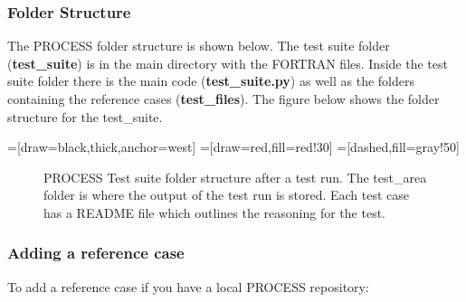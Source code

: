 \subsubsection{Folder Structure}

The PROCESS folder structure is shown below. The test suite folder (\textbf{test\_suite}) is in the main directory with the FORTRAN files. Inside the test suite folder there is the main code (\textbf{test\_suite.py}) as well as the folders containing the reference cases (\textbf{test\_files}). The figure below shows the folder structure for the test\_suite.

=[draw=black,thick,anchor=west]
=[draw=red,fill=red!30]
=[dashed,fill=gray!50]

\begin{figure}[!hb]
\centering
{}
\caption{PROCESS Test suite folder structure after a test run. The test\_area folder is where the output of the test run is stored. Each test case has a README file which outlines the reasoning for
the test.}
\label{fig:test suite struct}
\end{figure}

\subsubsection{Adding a reference case}
To add a reference case if you have a local PROCESS repository:

